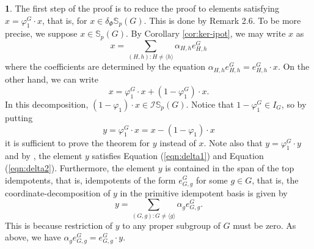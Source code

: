 \documentclass[12pt]{article}
\theoremstyle{plain}
\theoremstyle{definition}
\newtheorem{nothing}[theorem]{}
\newcommand{\kerlin}{\mathbb S_p}
\begin{document}
\begin{nothing}
The first step of the proof is to reduce the proof to elements satisfying $x = \varphi_1^G\cdot x$, that is, for $x\in\delta_\Phi\kerlin(G)$. This is done by Remark 2.6. To be more precise, we suppose $x\in \kerlin(G)$. By Corollary \ref{cor:ker-ipot}, we may write $x$ as \[ x = \sum_{(H, h): H\not = \langle h\rangle} \alpha_{H, h}e_{H, h}^G \] 
where the coefficients are determined by the equation $\alpha_{H, h}e_{H, h}^G = e_{H, h}^G\cdot x$.
On the other hand, we can write $$x = \varphi_1^G\cdot x + (1 - \varphi_1^G)\cdot x.$$ In this decomposition, $(1 - \varphi_1)\cdot x\in \mathcal I\kerlin (G)$.
Notice that $1-\varphi_1^G\in I_G$, so by putting $$y = \varphi_1^G\cdot x =x - (1 - \varphi_1)\cdot x$$ it is sufficient to prove the theorem for $y$ instead of $x$. Note also that $y = \varphi_1^G\cdot y$ and by \cite[Proposition 5.2]{Bouc2}, the element $y$ satisfies Equation (\ref{eqn:delta1}) and Equation (\ref{eqn:delta2}).
Furthermore, the element $y$ is contained in the span of the top idempotents, that is, idempotents of the form $e_{G, g}^G$ for some $g\in G$, that is, the coordinate-decomposition of $y$ in the primitive idempotent basis is given by
\begin{equation}\label{eqn:forY}
y = \sum_{(G, g): G\not = \langle g\rangle} \alpha_{g}e_{G, g}^G. 
\end{equation}
This is because restriction of $y$ to any proper subgroup of $G$ must be zero. As above, we have $\alpha_ge_{G, g}^G = e_{G, g}^G\cdot y$.
\end{nothing} 
\end{document}
